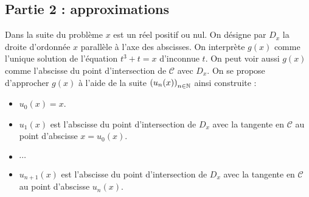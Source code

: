 \subsection*{Partie 2 : approximations}
Dans la suite du problème $x$ est un réel positif ou nul. On  désigne par $D_x$ la droite d'ordonnée $x$ parallèle à l'axe des abscisses. On interprète $g(x)$ comme l'unique solution de l'équation $t^3+t = x$ d'inconnue $t$. On peut voir aussi $g(x)$ comme l'abscisse du point d'intersection de $\mathcal C$ avec $D_x$.\newline
On se propose d'approcher $g(x)$ à l'aide de la suite $\left( u_n(x)\right) _{n\in \mathbb{N}}$ ainsi construite :
\begin{itemize}
 \item $u_0(x)=x$.
 \item $u_1(x)$ est l'abscisse du point d'intersection de $D_x$ avec la tangente en $\mathcal C$ au point d'abscisse $x=u_0(x)$.
 \item $\cdots$
 \item $u_{n+1}(x)$ est l'abscisse du point d'intersection de $D_x$ avec la tangente en $\mathcal C$ au point d'abscisse $u_n(x)$.
\end{itemize}
